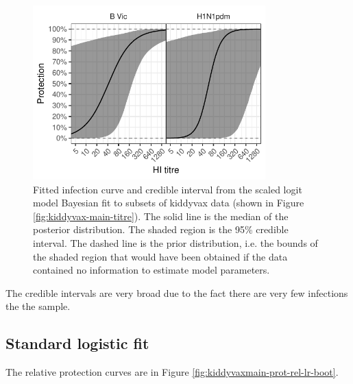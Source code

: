 \documentclass[12pt]{article}
\begin{document}
\begin{figure}[htp]
	\centering
	\includegraphics[width=0.8\textwidth]{../fit-sclr-bayesian-plot/kiddyvaxmain-prot.pdf}
	\caption{
Fitted infection curve and credible interval from the scaled logit model Bayesian fit to subsets of kiddyvax data (shown in Figure \ref{fig:kiddyvax-main-titre}). The solid line is the median of the posterior distribution. The shaded region is the 95\% credible interval. The dashed line is the prior distribution, i.e. the bounds of the shaded region that would have been obtained if the data contained no information to estimate model parameters.
	}
	\label{fig:kiddyvaxmain-prot-bayes-sclr}
\end{figure}

The credible intervals are very broad due to the fact there are very few infections the the sample.

\pagebreak
%
\subsection{Standard logistic fit}

The relative protection curves are in Figure \ref{fig:kiddyvaxmain-prot-rel-lr-boot}.
\end{document}
